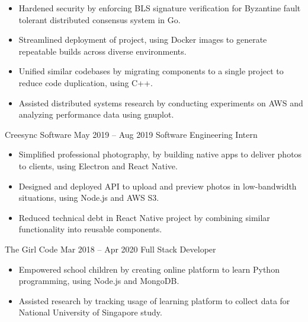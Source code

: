 \documentclass{article}
\begin{document}
{\begin{itemize} \itemsep -1pt
    \item Hardened security by enforcing BLS signature verification for Byzantine fault tolerant distributed consensus system in Go.
    \item Streamlined deployment of project, using Docker images to generate repeatable builds across diverse environments.
    \item Unified similar codebases by migrating components to a single project to reduce code duplication, using C++.
    \item Assisted distributed systems research by conducting experiments on AWS and analyzing performance data using gnuplot.
    \end{itemize}}
\vspace{1mm}
\iffalse
Designed and build native apps for professional photographers to deliver photos to clients, using Electron and React Native, and created API to preview uploaded photos in low-bandwidth situations, using Node.js and AWS S3. Reduced technical debt in React Native project by combining similar functionality into reusable components.
\fi
\WorkEntry
{Creesync Software}
{May 2019 -- Aug 2019}
{Software Engineering Intern}
{\begin{itemize} \itemsep -1pt
    \item Simplified professional photography, by building native apps to deliver photos to clients, using Electron and React Native.
    \item Designed and deployed API to upload and preview photos in low-bandwidth situations, using Node.js and AWS S3.
    \item Reduced technical debt in React Native project by combining similar functionality into reusable components.
    \end{itemize}}
\vspace{1mm}
\WorkEntry
{The Girl Code}
{Mar 2018 -- Apr 2020}
{Full Stack Developer}
{\begin{itemize} \itemsep -1pt
	\item Empowered school children by creating online platform to learn Python programming, using Node.js and MongoDB.
	\item Assisted research by tracking usage of learning platform to collect data for National University of Singapore study.
    \end{itemize}}
\end{document}

